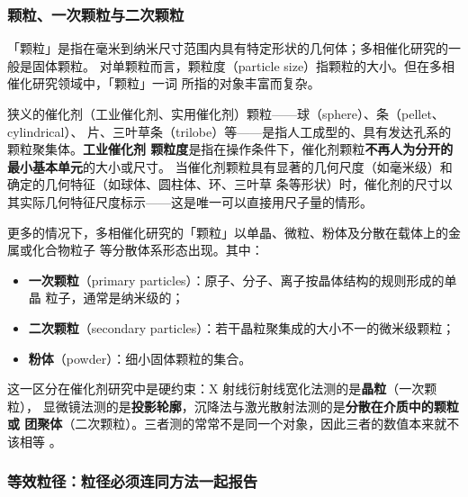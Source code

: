 \subsubsection{颗粒、一次颗粒与二次颗粒}

「颗粒」是指在毫米到纳米尺寸范围内具有特定形状的几何体；多相催化研究的一般是固体颗粒。
对单颗粒而言，颗粒度（particle size）指颗粒的大小。但在多相催化研究领域中，「颗粒」一词
所指的对象丰富而复杂。

狭义的催化剂（工业催化剂、实用催化剂）颗粒——球（sphere）、条（pellet、cylindrical）、
片、三叶草条（trilobe）等——是指人工成型的、具有发达孔系的颗粒聚集体。\textbf{工业催化剂
颗粒度}是指在操作条件下，催化剂颗粒\textbf{不再人为分开的最小基本单元}的大小或尺寸。
当催化剂颗粒具有显著的几何尺度（如毫米级）和确定的几何特征（如球体、圆柱体、环、三叶草
条等形状）时，催化剂的尺寸以其实际几何特征尺度标示——这是唯一可以直接用尺子量的情形。

更多的情况下，多相催化研究的「颗粒」以单晶、微粒、粉体及分散在载体上的金属或化合物粒子
等分散体系形态出现。其中：

\begin{itemize}
\item \textbf{一次颗粒}（primary particles）：原子、分子、离子按晶体结构的规则形成的单晶
粒子，通常是纳米级的；
\item \textbf{二次颗粒}（secondary particles）：若干晶粒聚集成的大小不一的微米级颗粒；
\item \textbf{粉体}（powder）：细小固体颗粒的集合。
\end{itemize}

这一区分在催化剂研究中是硬约束：X 射线衍射线宽化法测的是\textbf{晶粒}（一次颗粒），
显微镜法测的是\textbf{投影轮廓}，沉降法与激光散射法测的是\textbf{分散在介质中的颗粒或
团聚体}（二次颗粒）。三者测的常常不是同一个对象，因此三者的数值本来就不该相等
。

\subsubsection{等效粒径：粒径必须连同方法一起报告}


